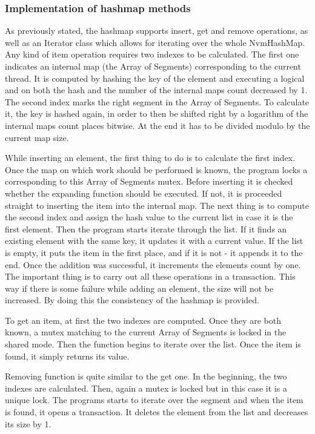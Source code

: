     \subsubsection{Implementation of hashmap methods}
        As previously stated, the hashmap supports insert, get and remove operations, as well as an Iterator class which allows for iterating over the whole NvmHashMap. Any kind of item operation requires two indexes to be calculated. The first one indicates an internal map (the Array of Segments) corresponding to the current thread. It is computed by hashing the key of the element and executing a logical and on both the hash and the number of the internal maps count decreased by 1. The second index marks the right segment in the Array of Segments. To calculate it, the key is hashed again, in order to then be shifted right by a logarithm of the internal maps count places bitwise. At the end it has to be divided modulo by the current map size.
    
        While inserting an element, the first thing to do is to calculate the first index. Once the map on which work should be performed is known, the program locks a corresponding to this Array of Segments mutex. Before inserting it is checked whether the expanding function should be executed. If not, it is proceeded straight to inserting the item into the internal map. The next thing is to compute the second index and assign the hash value to the current list in case it is the first element. Then the program starts iterate through the list. If it finds an existing element with the same key, it updates it with a current value. If the list is empty, it puts the item in the first place, and if it is not - it appends it to the end. Once the addition was successful, it increments the elements count by one. The important thing is to carry out all these operations in a transaction. This way if there is some failure while adding an element, the size will not be increased. By doing this the consistency of the hashmap is provided.
        
        To get an item, at first the two indexes are computed. Once they are both known, a mutex matching to the current Array of Segments is locked in the shared mode. Then the function begins to iterate over the list. Once the item is found, it simply returns its value.
    
        Removing function is quite similar to the get one. In the beginning, the two indexes are calculated. Then, again a mutex is locked but in this case it is a unique lock. The programs starts to iterate over the segment and when the item is found, it opens a transaction. It deletes the element from the list and decreases its size by 1.
            
